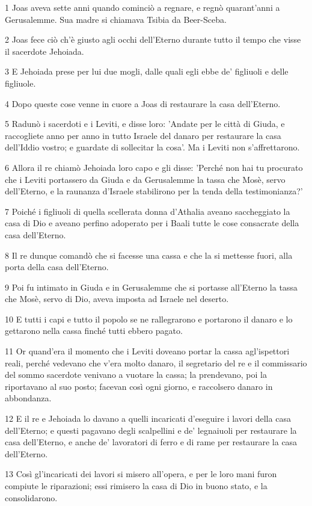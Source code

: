\par 1 Joas aveva sette anni quando cominciò a regnare, e regnò quarant'anni a Gerusalemme. Sua madre si chiamava Tsibia da Beer-Sceba.
\par 2 Joas fece ciò ch'è giusto agli occhi dell'Eterno durante tutto il tempo che visse il sacerdote Jehoiada.
\par 3 E Jehoiada prese per lui due mogli, dalle quali egli ebbe de' figliuoli e delle figliuole.
\par 4 Dopo queste cose venne in cuore a Joas di restaurare la casa dell'Eterno.
\par 5 Radunò i sacerdoti e i Leviti, e disse loro: 'Andate per le città di Giuda, e raccogliete anno per anno in tutto Israele del danaro per restaurare la casa dell'Iddio vostro; e guardate di sollecitar la cosa'. Ma i Leviti non s'affrettarono.
\par 6 Allora il re chiamò Jehoiada loro capo e gli disse: 'Perché non hai tu procurato che i Leviti portassero da Giuda e da Gerusalemme la tassa che Mosè, servo dell'Eterno, e la raunanza d'Israele stabilirono per la tenda della testimonianza?'
\par 7 Poiché i figliuoli di quella scellerata donna d'Athalia aveano saccheggiato la casa di Dio e aveano perfino adoperato per i Baali tutte le cose consacrate della casa dell'Eterno.
\par 8 Il re dunque comandò che si facesse una cassa e che la si mettesse fuori, alla porta della casa dell'Eterno.
\par 9 Poi fu intimato in Giuda e in Gerusalemme che si portasse all'Eterno la tassa che Mosè, servo di Dio, aveva imposta ad Israele nel deserto.
\par 10 E tutti i capi e tutto il popolo se ne rallegrarono e portarono il danaro e lo gettarono nella cassa finché tutti ebbero pagato.
\par 11 Or quand'era il momento che i Leviti doveano portar la cassa agl'ispettori reali, perché vedevano che v'era molto danaro, il segretario del re e il commissario del sommo sacerdote venivano a vuotare la cassa; la prendevano, poi la riportavano al suo posto; facevan così ogni giorno, e raccolsero danaro in abbondanza.
\par 12 E il re e Jehoiada lo davano a quelli incaricati d'eseguire i lavori della casa dell'Eterno; e questi pagavano degli scalpellini e de' legnaiuoli per restaurare la casa dell'Eterno, e anche de' lavoratori di ferro e di rame per restaurare la casa dell'Eterno.
\par 13 Così gl'incaricati dei lavori si misero all'opera, e per le loro mani furon compiute le riparazioni; essi rimisero la casa di Dio in buono stato, e la consolidarono.
